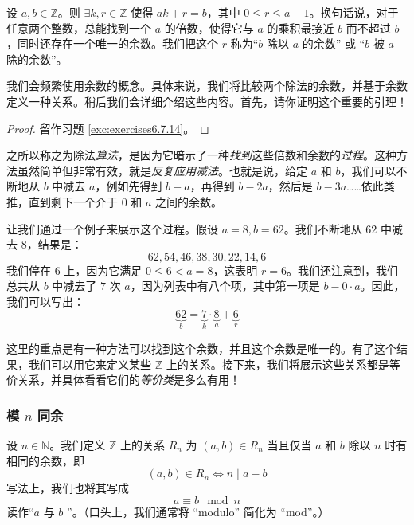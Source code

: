\begin{lemma}[除法算法]\label{lemma6.5.2}
    设 $a,b \in \mathbb{Z}$。则 $\exists k, r \in \mathbb{Z}$ 使得 $ak + r = b$，其中 $0 \le r \le a - 1$。换句话说，对于任意两个整数，总能找到一个 $a$ 的倍数，使得它与 $a$ 的乘积最接近 $b$ 而不超过 $b$，同时还存在一个唯一的余数。我们把这个 $r$ 称为``$b$ 除以 $a$ 的余数'' 或 ``$b$ 被 $a$ 除的余数''。
\end{lemma}

我们会频繁使用余数的概念。具体来说，我们将比较两个除法的余数，并基于余数定义一种关系。稍后我们会详细介绍这些内容。首先，请你证明这个重要的引理！

\begin{proof}
    留作习题 \ref{exc:exercises6.7.14}。
\end{proof}

之所以称之为除法\emph{算法}，是因为它暗示了一种\emph{找到}这些倍数和余数的\emph{过程}。这种方法虽然简单但非常有效，就是\emph{反复应用减法}。也就是说，给定 $a$ 和 $b$，我们可以不断地从 $b$ 中减去 $a$，例如先得到 $b - a$，再得到 $b - 2a$，然后是 $b - 3a$……依此类推，直到剩下一个介于 $0$ 和 $a$ 之间的余数。\\

\begin{example}
    让我们通过一个例子来展示这个过程。假设 $a = 8, b = 62$。我们不断地从 $62$ 中减去 $8$，结果是：
    \[62, 54, 46, 38, 30, 22, 14, 6\]
    我们停在 $6$ 上，因为它满足 $0 \le 6 < a = 8$，这表明 $r = 6$。我们还注意到，我们总共从 $b$ 中减去了 $7$ 次 $a$，因为列表中有八个项，其中第一项是 $b - 0 \cdot a$。因此，我们可以写出：
    \[\underbrace{62}_{b} = \underbrace{7}_{k} \cdot \underbrace{8}_{a} + \underbrace{6}_{r}\]
\end{example}

这里的重点是有一种方法可以找到这个余数，并且这个余数是唯一的。有了这个结果，我们可以用它来定义某些 $\mathbb{Z}$ 上的关系。接下来，我们将展示这些关系都是等价关系，并具体看看它们的\emph{等价类}是多么有用！

\subsubsection*{模 $n$ 同余}

\begin{definition}\label{def:definition6.5.4}
    设 $n \in \mathbb{N}$。我们定义 $\mathbb{Z}$ 上的关系 $R_n$ 为 $(a,b) \in R_n$ 当且仅当 $a$ 和 $b$ 除以 $n$ 时有相同的余数，即
    \[(a,b) \in R_n \iff n \mid a-b\] 
    写法上，我们也将其写成
    \[a \equiv b \mod n\]
    读作``$a$ 与 $b$ ''。（口头上，我们通常将 ``modulo'' 简化为 ``mod''。）
\end{definition}

